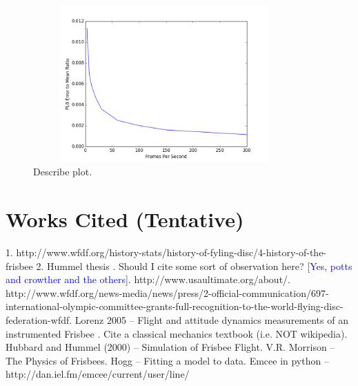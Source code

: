 \documentclass[a4paper,12pt, oneside]{article}
\newcommand{\blue}[1]{\textcolor{blue}{#1}}
\begin{document}
\begin{figure}[H]
        \includegraphics[width=10cm, height=6cm]{errortomeanratiovsFPS}
	\centering
	\caption{\color{red} Describe plot.}
\end{figure}



\section{Works Cited (Tentative)}

1. http://www.wfdf.org/history-stats/history-of-fyling-disc/4-history-of-the-frisbee
2. Hummel thesis . Should I cite some sort of observation here? [\blue{Yes, potts and crowther and the others}]. http://www.usaultimate.org/about/. http://www.wfdf.org/news-media/news/press/2-official-communication/697-international-olympic-committee-grants-full-recognition-to-the-world-flying-disc-federation-wfdf. Lorenz 2005 -- Flight and attitude dynamics measurements of an instrumented Frisbee . Cite a classical mechanics textbook (i.e. NOT wikipedia). Hubbard and Hummel (2000) -- Simulation of Frisbee Flight. V.R. Morrison -- The Physics of Frisbees. Hogg -- Fitting a model to data. Emcee in python -- http://dan.iel.fm/emcee/current/user/line/\newline
\end{document}

